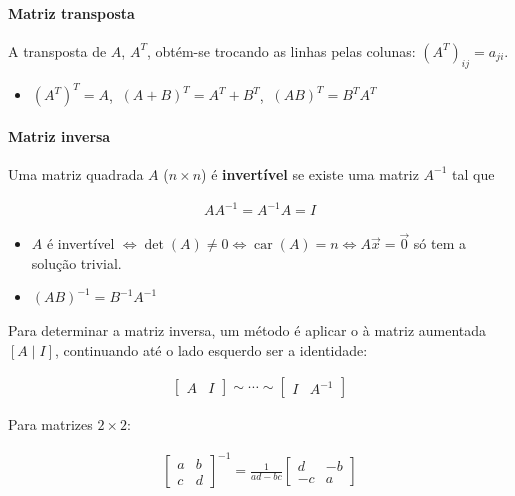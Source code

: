 \documentclass{article}
\begin{document}
\paragraph{Matriz transposta}

A transposta de $A$, $A^T$, obtém-se trocando as linhas pelas colunas: $(A^T)_{ij} = a_{ji}$.

\begin{itemize}
    \item $(A^T)^T = A$, $\ (A + B)^T = A^T + B^T$, $\ (AB)^T = B^T A^T$
\end{itemize}

\paragraph{Matriz inversa}
\label{par: matriz-inversa}

Uma matriz quadrada $A$ ($n \times n$) é \textbf{invertível} se existe uma matriz $A^{-1}$ tal que

\begin{gather*}
A A^{-1} = A^{-1} A = I
\end{gather*}

\begin{itemize}
    \item $A$ é invertível $\iff \det(A) \neq 0 \iff \operatorname{car}(A) = n \iff A\vec{x} = \vec{0}$ só tem a
    solução trivial.
    \item $(AB)^{-1} = B^{-1}A^{-1}$
\end{itemize}

Para determinar a matriz inversa, um método é aplicar o  à matriz aumentada
$[A \mid I]$, continuando até o lado esquerdo ser a identidade:

\begin{gather*}
\left[ \begin{array}{c|c} A & I \end{array} \right] \sim \cdots \sim
\left[ \begin{array}{c|c} I & A^{-1} \end{array} \right]
\end{gather*}

Para matrizes $2 \times 2$:

\begin{gather*}
\boxed{
\begin{bmatrix}
a & b \\
c & d
\end{bmatrix}^{-1}
= \frac{1}{ad - bc}
\begin{bmatrix}
d & -b \\
-c & a
\end{bmatrix}}
\end{gather*}
\end{document}
